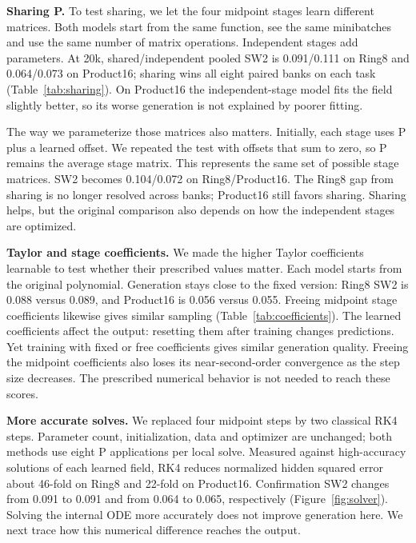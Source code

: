 \documentclass[11pt]{article}
\begin{document}
\textbf{Sharing P.} To test sharing, we let the four midpoint stages learn
different matrices. Both models start from the same function, see the same
minibatches and use the same number of matrix operations. Independent stages
add parameters. At 20k, shared/independent pooled SW2 is
0.091/0.111 on Ring8 and 0.064/0.073 on Product16; sharing wins all eight
paired banks on each task (Table~\ref{tab:sharing}). On Product16 the
independent-stage model fits the field slightly better, so its worse
generation is not explained by poorer fitting.

The way we parameterize those matrices also matters. Initially, each stage
uses P plus a learned offset. We repeated the test with offsets that sum to
zero, so P remains the average stage matrix. This represents the same set of
possible stage matrices. SW2 becomes 0.104/0.072 on Ring8/Product16. The Ring8
gap from sharing is no longer resolved across banks; Product16 still favors
sharing. Sharing helps, but the original comparison also depends on how the
independent stages are optimized.

\textbf{Taylor and stage coefficients.} We made the higher Taylor
coefficients learnable to test whether their prescribed values matter.
Each model starts from the original polynomial. Generation stays close to
the fixed version: Ring8 SW2 is 0.088 versus 0.089, and Product16 is 0.056
versus 0.055. Freeing midpoint stage coefficients likewise gives similar
sampling (Table~\ref{tab:coefficients}). The learned coefficients affect the
output: resetting them after training changes predictions. Yet training with
fixed or free coefficients gives similar generation quality. Freeing the
midpoint coefficients also loses its near-second-order convergence as the step
size decreases. The prescribed numerical behavior is not needed to reach these
scores.

\textbf{More accurate solves.} We replaced four midpoint steps by two
classical RK4 steps. Parameter count, initialization, data and optimizer are
unchanged; both methods use eight P applications per local solve. Measured
against high-accuracy solutions of each learned field, RK4 reduces normalized
hidden squared error about 46-fold on Ring8 and 22-fold on Product16.
Confirmation SW2 changes from 0.091 to 0.091 and from 0.064 to 0.065,
respectively (Figure~\ref{fig:solver}). Solving the internal ODE more accurately
does not improve generation here. We next trace how this numerical difference
reaches the output.

\newpage
\end{document}
